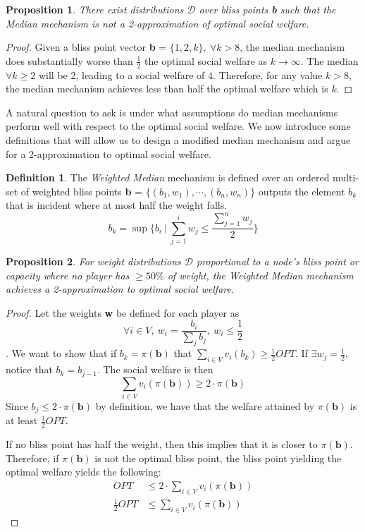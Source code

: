 \documentclass{article}
\newtheorem{proposition}{Proposition}[section]
\theoremstyle{definition}
\newtheorem{definition}{Definition}[section]
\theoremstyle{definition}
\begin{document}
\begin{proposition}
There exist distributions $\mathcal{D}$ over bliss points \textbf{b} such that the Median mechanism is not a 2-approximation of optimal social welfare.
\end{proposition}
\begin{proof}
Given a bliss point vector \textbf{b} = $\{1,2,k\},~\forall k > 8$, the median mechanism does substantially worse than $\frac{1}{2}$ the optimal social welfare as $k\longrightarrow \infty$. The median $\forall k 
\geq 2$ will be 2, leading to a social welfare of $4$. Therefore, for any value $k > 8$, the median mechanism achieves less than half the optimal welfare which is $k$.
\end{proof}

A natural question to ask is under what assumptions do median mechanisms perform well with respect to the optimal social welfare. We now introduce some definitions that will allow us to design a modified median mechanism and argue for a 2-approximation to optimal social welfare.
\begin{definition}
The \textit{Weighted Median} mechanism is defined over an ordered multi-set of weighted bliss points \textbf{b} = $\{(b_1, w_1),\cdots,(b_n, w_n)\}$ outputs the element $b_k$ that is incident where at most half the weight falls.
$$
b_k = \sup\{b_i~|~\sum_{j=1}^i w_j \leq \frac{\sum_{j=1}^n w_j}{2}\}
$$
\end{definition}
\begin{proposition}
For weight distributions $\mathcal{D}$ proportional to a node's bliss point or capacity where no player has $\geq 50\%$ of weight, the Weighted Median mechanism achieves a 2-approximation to optimal social welfare.
\end{proposition}
\begin{proof}
Let the weights \textbf{w} be defined for each player as 
$$
\forall i\in V,~w_i = \frac{b_i}{\sum_{j} b_j},~w_i\leq \frac{1}{2}
$$. We want to show that if $b_k=\pi(\textbf{b})$ that $\sum_{i\in V}v_i(b_k)\geq \frac{1}{2} OPT$. If $\exists w_j = \frac{1}{2}$, notice that $b_k=b_{j-1}$. The social welfare is then 
$$
\sum_{i\in V} v_i(\pi(\textbf{b})) \geq 2\cdot \pi(\textbf{b})
$$
Since $b_j \leq 2\cdot \pi(\textbf{b})$ by definition, we have that the welfare attained by $\pi(\textbf{b})$ is at least $\frac{1}{2}OPT$.

If no bliss point has half the weight, then this implies that it is closer to $\pi(\textbf{b})$. Therefore, if $\pi(\textbf{b})$ is not the optimal bliss point, the bliss point yielding the optimal welfare yields the following:
\begin{align*}
OPT &\leq 2\cdot \sum_{i\in V} v_i(\pi(\textbf{b})) \\
\frac{1}{2} OPT &\leq \sum_{i\in V} v_i(\pi(\textbf{b}))
\end{align*}
\end{proof}
\end{document}
